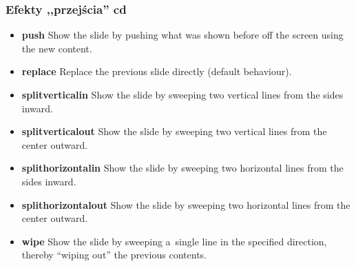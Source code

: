 \begin{frame}
 \frametitle<presentation>{Efekty ,,przejścia'' cd}
 \begin{itemize}
  \item<1>
        \textbf{push}
        Show the slide by pushing what was shown before off the screen using the new content.
  \item<2>
        \textbf{replace}
        Replace the previous slide directly (default behaviour).
  \item<3>
        \textbf{splitverticalin}
        Show the slide by sweeping two vertical lines from the sides inward.
  \item<4>
        \textbf{splitverticalout}
        Show the slide by sweeping two vertical lines from the center outward.
  \item<5>
        \textbf{splithorizontalin}
        Show the slide by sweeping two horizontal lines from the sides inward.
  \item<6>
        \textbf{splithorizontalout}
        Show the slide by sweeping two horizontal lines from the center outward.
  \item<7>
        \textbf{wipe}
        Show the slide by sweeping a~single line in the specified direction, thereby “wiping out” the previous contents.
 \end{itemize}
\end{frame}


